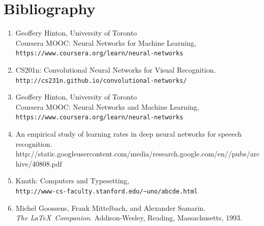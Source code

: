 \documentclass[a4paper,12pt]{report}%
\begin{document}
\chapter{\color{IAF} \bf Bibliography}
%

\begin{enumerate}%


\item[Hinton]
    Geoffery Hinton, University of Toronto \\
    Coursera MOOC: Neural Networks for Machine Learning, \\
    \texttt{https://www.coursera.org/learn/neural-networks}

\item[CS201n]
    CS201n: Convolutional Neural Networks for Visual Recognition. \\
    \texttt{http://cs231n.github.io/convolutional-networks/}


\item[Hinton]
    Geoffery Hinton, University of Toronto \\
    Coursera MOOC: Neural Networks and Machine Learning,\\
    \texttt{https://www.coursera.org/learn/neural-networks}


\item[Google]
    An empirical study of learning rates in deep neural networks for speeech recognition.\\
    {\tiny  http://static.googleusercontent.com/media/research.google.com/en//pubs/archive/40808.pdf}

\item[Knuth]
    Knuth: Computers and Typesetting,\\
    \texttt{http://www-cs-faculty.stanford.edu/\~{}uno/abcde.html}

\item[\TeX]
    Michel Goossens, Frank Mittelbach, and Alexander Samarin. \\
    \textit{The \LaTeX\ Companion}.
    Addison-Wesley, Reading, Massachusetts, 1993.
\end{enumerate}





\printindex

\end{document}
